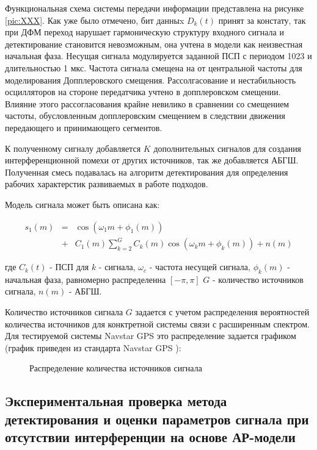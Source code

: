 Функциональная схема системы передачи информации представлена на рисунке \ref{pic:XXX}. Как уже было отмечено, бит данныx ${D_k(t)}$
принят за констату, так при ДФМ переход нарушает гармоническую структуру входного сигнала и детектирование становится невозможным,
она учтена в модели как неизвестная начальная фаза. Несущая сигнала модулируется заданной ПСП с периодом 1023 и длительностью 1 мкс.
Частота сигнала смещена на от центральной частоты для моделирования Допплеровского смещения. Рассолгасование и нестабильность
осцилляторов на стороне передатчика учтено в допплеровском смещении. Влияние этого рассогласования крайне невилико в сравнении
со смещением частоты, обусловленным допплеровским смещением в следствии движения передающего и принимающего сегментов.

К полученному сигналу добавляется ${K}$ дополнительных сигналов для создания интерференционной помехи от других источников,
так же добавляется АБГШ. Полученная смесь подавалась на алгоритм детектирования для определения рабочих характерстик развиваемых в работе подходов.

Модель сигнала может быть описана как:
\begin{center}
\begin{eqnarray}
	\label{eq:sec4_model}
	s_1(m)	& = & \cos(\omega_{1}m + \phi_1(m)) \nonumber \\
		& + & C_1(m) \sum \limits_{k=2}^{G}C_k(m)\cos(\omega_{k}m + \phi_k(m)) + n(m)
\end{eqnarray}
\end{center}где ${C_k(t)}$ - ПСП для ${k}$ - сигнала, ${\omega_{c}}$ - частота несущей сигнала, ${\phi_k(m)}$ - начальная фаза, равномерно распределенна ${[-\pi, \pi]}$
${G}$ - количество источников сигнала, ${n(m)}$ - АБГШ.

Количество источников сигнала ${G}$ задается с учетом распределения вероятностей количества источников для конктретной системы
связи с расширенным спектром. Для тестируемой системы Navstar GPS это распределение задается графиком (график приведен из стандарта Navstar GPS \cite{gpsuserequipment}):
\begin{figure}[ht]
	\center{}
	\caption{Распределение количества источников сигнала}
	\label{pic:sec1_bpsk}
\end{figure}

\subsection{Экспериментальная проверка метода детектирования и оценки параметров сигнала при отсутствии интерференции на основе АР-модели}

